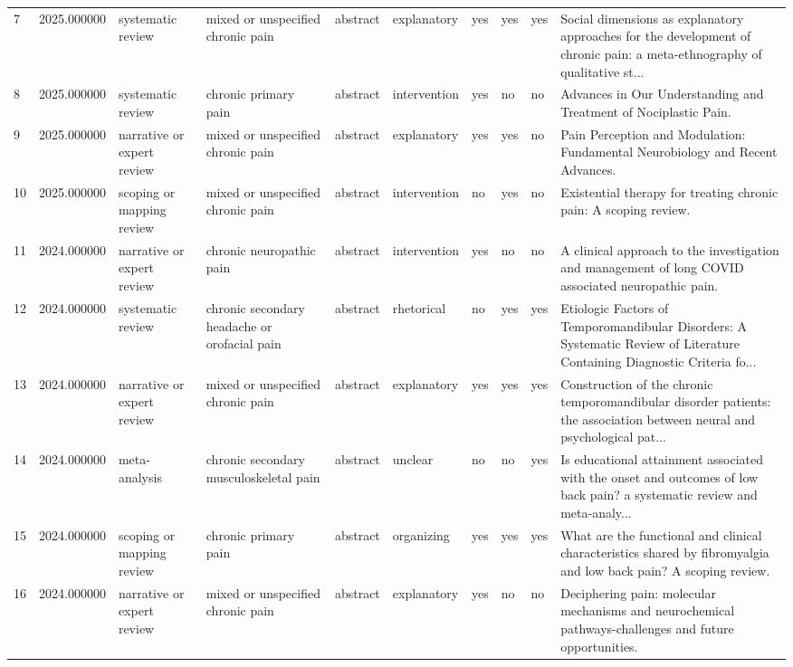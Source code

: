 \begin{longtable}{p{0.7cm}p{0.7cm}p{1.2cm}p{1.9cm}p{1.3cm}p{1.5cm}p{0.55cm}p{0.55cm}p{0.55cm}p{3.2cm}}
7 & 2025.000000 & systematic review & mixed or unspecified chronic pain & abstract & explanatory & yes & yes & yes & Social dimensions as explanatory approaches for the development of chronic pain: a meta-ethnography of qualitative st... \\
8 & 2025.000000 & systematic review & chronic primary pain & abstract & intervention & yes & no & no & Advances in Our Understanding and Treatment of Nociplastic Pain. \\
9 & 2025.000000 & narrative or expert review & mixed or unspecified chronic pain & abstract & explanatory & yes & yes & no & Pain Perception and Modulation: Fundamental Neurobiology and Recent Advances. \\
10 & 2025.000000 & scoping or mapping review & mixed or unspecified chronic pain & abstract & intervention & no & yes & no & Existential therapy for treating chronic pain: A scoping review. \\
11 & 2024.000000 & narrative or expert review & chronic neuropathic pain & abstract & intervention & yes & no & no & A clinical approach to the investigation and management of long COVID associated neuropathic pain. \\
12 & 2024.000000 & systematic review & chronic secondary headache or orofacial pain & abstract & rhetorical & no & yes & yes & Etiologic Factors of Temporomandibular Disorders: A Systematic Review of Literature Containing Diagnostic Criteria fo... \\
13 & 2024.000000 & narrative or expert review & mixed or unspecified chronic pain & abstract & explanatory & yes & yes & yes & Construction of the chronic temporomandibular disorder patients: the association between neural and psychological pat... \\
14 & 2024.000000 & meta-analysis & chronic secondary musculoskeletal pain & abstract & unclear & no & no & yes & Is educational attainment associated with the onset and outcomes of low back pain? a systematic review and meta-analy... \\
15 & 2024.000000 & scoping or mapping review & chronic primary pain & abstract & organizing & yes & yes & yes & What are the functional and clinical characteristics shared by fibromyalgia and low back pain? A scoping review. \\
16 & 2024.000000 & narrative or expert review & mixed or unspecified chronic pain & abstract & explanatory & yes & no & no & Deciphering pain: molecular mechanisms and neurochemical pathways-challenges and future opportunities. \\

\end{longtable}

